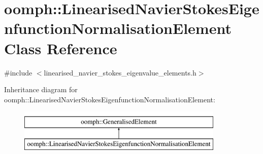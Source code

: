 \hypertarget{classoomph_1_1LinearisedNavierStokesEigenfunctionNormalisationElement}{}\section{oomph\+:\+:Linearised\+Navier\+Stokes\+Eigenfunction\+Normalisation\+Element Class Reference}
\label{classoomph_1_1LinearisedNavierStokesEigenfunctionNormalisationElement}


{\ttfamily \#include $<$linearised\+\_\+navier\+\_\+stokes\+\_\+eigenvalue\+\_\+elements.\+h$>$}

Inheritance diagram for oomph\+:\+:Linearised\+Navier\+Stokes\+Eigenfunction\+Normalisation\+Element\+:\begin{figure}[H]
\begin{center}
\leavevmode
\includegraphics[height=2.000000cm]{classoomph_1_1LinearisedNavierStokesEigenfunctionNormalisationElement}
\end{center}
\end{figure}
